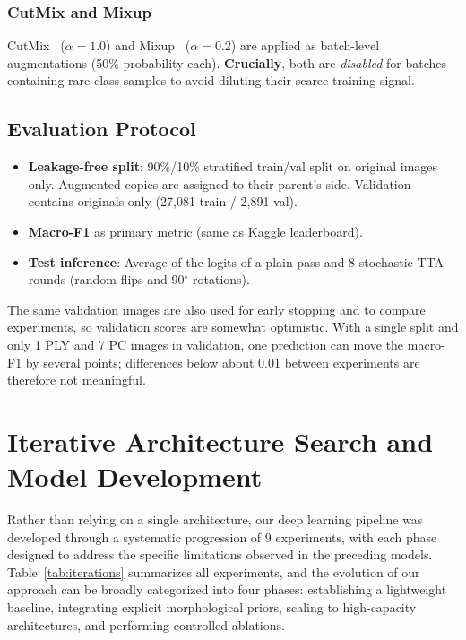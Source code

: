 \documentclass[twocolumn,a4paper]{article}
\begin{document}
\subsubsection{CutMix and Mixup}

CutMix~\cite{yun2019cutmix} ($\alpha=1.0$) and Mixup~\cite{zhang2018mixup} ($\alpha=0.2$) are applied as batch-level augmentations (50\% probability each). \textbf{Crucially}, both are \textit{disabled} for batches containing rare class samples to avoid diluting their scarce training signal.

\subsection{Evaluation Protocol}
\label{sec:eval}

\begin{itemize}
    \item \textbf{Leakage-free split}: 90\%/10\% stratified train/val split on original images only. Augmented copies are assigned to their parent's side. Validation contains originals only (27,081 train / 2,891 val).
    \item \textbf{Macro-F1} as primary metric (same as Kaggle leaderboard).
    \item \textbf{Test inference}: Average of the logits of a plain pass and 8 stochastic TTA rounds (random flips and 90$^\circ$ rotations).
\end{itemize}

The same validation images are also used for early stopping and to compare experiments, so validation scores are somewhat optimistic. With a single split and only 1 PLY and 7 PC images in validation, one prediction can move the macro-F1 by several points; differences below about 0.01 between experiments are therefore not meaningful.

\section{Iterative Architecture Search and Model Development}
\label{sec:iterations}

Rather than relying on a single architecture, our deep learning pipeline was developed through a systematic progression of 9 experiments, with each phase designed to address the specific limitations observed in the preceding models. Table~\ref{tab:iterations} summarizes all experiments, and the evolution of our approach can be broadly categorized into four phases: establishing a lightweight baseline, integrating explicit morphological priors, scaling to high-capacity architectures, and performing controlled ablations.
\end{document}
